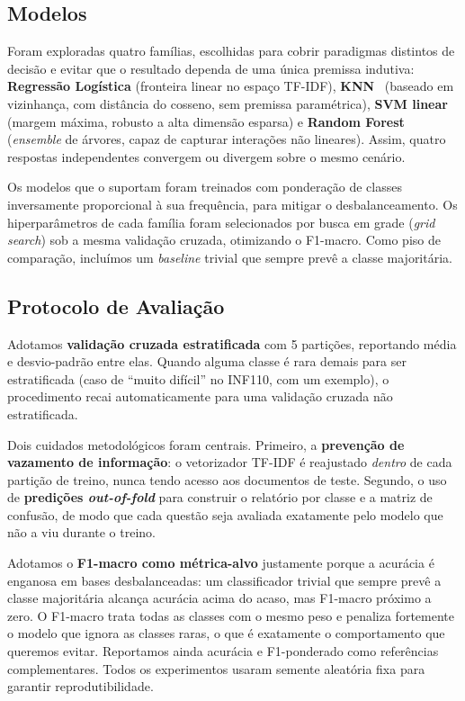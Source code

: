 \documentclass[sigconf]{webmedia}
\begin{document}
\subsection{Modelos}

Foram exploradas quatro famílias, escolhidas para cobrir paradigmas distintos de decisão e evitar que o resultado dependa de uma única premissa indutiva: \textbf{Regressão Logística} (fronteira linear no espaço TF-IDF), \textbf{KNN}~\cite{coverhart1967} (baseado em vizinhança, com distância do cosseno, sem premissa paramétrica), \textbf{SVM linear}~\cite{cortes1995} (margem máxima, robusto a alta dimensão esparsa) e \textbf{Random Forest}~\cite{breiman2001} (\textit{ensemble} de árvores, capaz de capturar interações não lineares). Assim, quatro respostas independentes convergem ou divergem sobre o mesmo cenário.

Os modelos que o suportam foram treinados com ponderação de classes inversamente proporcional à sua frequência, para mitigar o desbalanceamento. Os hiperparâmetros de cada família foram selecionados por busca em grade (\textit{grid search}) sob a mesma validação cruzada, otimizando o F1-macro. Como piso de comparação, incluímos um \textit{baseline} trivial que sempre prevê a classe majoritária.

\subsection{Protocolo de Avaliação}
\label{sec:protocolo}

Adotamos \textbf{validação cruzada estratificada} com 5 partições, reportando média e desvio-padrão entre elas. Quando alguma classe é rara demais para ser estratificada (caso de ``muito difícil'' no INF110, com um exemplo), o procedimento recai automaticamente para uma validação cruzada não estratificada.

Dois cuidados metodológicos foram centrais. Primeiro, a \textbf{prevenção de vazamento de informação}: o vetorizador TF-IDF é reajustado \emph{dentro} de cada partição de treino, nunca tendo acesso aos documentos de teste. Segundo, o uso de \textbf{predições \textit{out-of-fold}} para construir o relatório por classe e a matriz de confusão, de modo que cada questão seja avaliada exatamente pelo modelo que não a viu durante o treino.

Adotamos o \textbf{F1-macro como métrica-alvo} justamente porque a acurácia é enganosa em bases desbalanceadas: um classificador trivial que sempre prevê a classe majoritária alcança acurácia acima do acaso, mas F1-macro próximo a zero. O F1-macro trata todas as classes com o mesmo peso e penaliza fortemente o modelo que ignora as classes raras, o que é exatamente o comportamento que queremos evitar. Reportamos ainda acurácia e F1-ponderado como referências complementares. Todos os experimentos usaram semente aleatória fixa para garantir reprodutibilidade.
\end{document}
